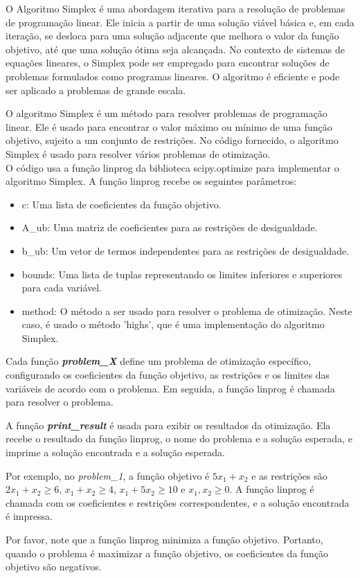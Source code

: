\documentclass[11pt]{article}
\theoremstyle{definition} \newtheorem{definition}{Definição}
\theoremstyle{definition} \newtheorem{example}{Exemplo}
\begin{document}
{O Algoritmo Simplex é uma abordagem iterativa para a resolução de problemas de programação linear. Ele inicia a partir de uma solução viável básica e, em cada iteração, se desloca para uma solução adjacente que melhora o valor da função objetivo, até que uma solução ótima seja alcançada. No contexto de sistemas de equações lineares, o Simplex pode ser empregado para encontrar soluções de problemas formulados como programas lineares. O algoritmo é eficiente e pode ser aplicado a problemas de grande escala.} {
O algoritmo Simplex é um método para resolver problemas de programação linear. Ele é usado para encontrar o valor máximo ou mínimo de uma função objetivo, sujeito a um conjunto de restrições. No código fornecido, o algoritmo Simplex é usado para resolver vários problemas de otimização.\\O código usa a função linprog da biblioteca scipy.optimize para implementar o algoritmo Simplex. A função linprog recebe os seguintes parâmetros:
\begin{itemize}
    \item c: Uma lista de coeficientes da função objetivo.
    \item A\_ub: Uma matriz de coeficientes para as restrições de desigualdade.
    \item b\_ub: Um vetor de termos independentes para as restrições de desigualdade.
    \item bounds: Uma lista de tuplas representando os limites inferiores e superiores para cada variável.
    \item method: O método a ser usado para resolver o problema de otimização. Neste caso, é usado o método 'highs', que é uma implementação do algoritmo Simplex.
\end{itemize}
Cada função \textbf{\textit{problem\_X}} define um problema de otimização específico, configurando os coeficientes da função objetivo, as restrições e os limites das variáveis de acordo com o problema. Em seguida, a função linprog é chamada para resolver o problema.

A função \textbf{\textit{print\_result}} é usada para exibir os resultados da otimização. Ela recebe o resultado da função linprog, o nome do problema e a solução esperada, e imprime a solução encontrada e a solução esperada.

Por exemplo, no \textit{problem\_1}, a função objetivo é \(5x_1 + x_2\) e as restrições são \(2x_1 + x_2 \geq 6\), \(x_1 + x_2 \geq 4\), \(x_1 + 5x_2 \geq 10\) e \(x_1, x_2 \geq 0\). A função linprog é chamada com os coeficientes e restrições correspondentes, e a solução encontrada é impressa.

Por favor, note que a função linprog minimiza a função objetivo. Portanto, quando o problema é maximizar a função objetivo, os coeficientes da função objetivo são negativos.
}
\end{document}
